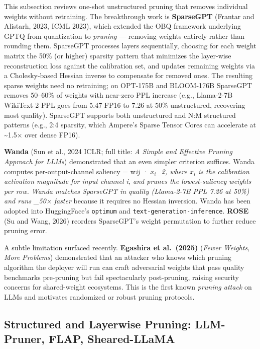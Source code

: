This subsection reviews one-shot unstructured pruning that removes individual weights without retraining. The breakthrough work is \textbf{SparseGPT} (Frantar and Alistarh, 2023, ICML 2023), which extended the OBQ framework underlying GPTQ from quantization to \emph{pruning} --- removing weights entirely rather than rounding them. SparseGPT processes layers sequentially, choosing for each weight matrix the 50\% (or higher) sparsity pattern that minimizes the layer-wise reconstruction loss against the calibration set, and updates remaining weights via a Cholesky-based Hessian inverse to compensate for removed ones. The resulting sparse weights need no retraining; on OPT-175B and BLOOM-176B SparseGPT removes 50--60\% of weights with near-zero PPL increase (e.g., Llama-2-7B WikiText-2 PPL goes from 5.47 FP16 to 7.26 at 50\% unstructured, recovering most quality). SparseGPT supports both unstructured and N:M structured patterns (e.g., 2:4 sparsity, which Ampere's Sparse Tensor Cores can accelerate at \textasciitilde1.5× over dense FP16).

\textbf{Wanda} (Sun et al., 2024 ICLR; full title: \emph{A Simple and Effective Pruning Approach for LLMs}) demonstrated that an even simpler criterion suffices. Wanda computes per-output-channel saliency = \textbar w\emph{ij\textbar{} · \textbar\textbar{}\(x_i\)\textbar\textbar\_2, where \(x_i\) is the calibration activation magnitude for input channel i, and prunes the lowest-saliency weights per row. Wanda matches SparseGPT in quality (Llama-2-7B PPL 7.26 at 50\%) and runs \_50× faster} because it requires no Hessian inversion. Wanda has been adopted into HuggingFace's \texttt{optimum} and \texttt{text-generation-inference}. \textbf{ROSE} (Su and Wang, 2026) reorders SparseGPT's weight permutation to further reduce pruning error.

A subtle limitation surfaced recently. \textbf{Egashira et al.~(2025)} (\emph{Fewer Weights, More Problems}) demonstrated that an attacker who knows which pruning algorithm the deployer will run can craft adversarial weights that pass quality benchmarks pre-pruning but fail spectacularly post-pruning, raising security concerns for shared-weight ecosystems. This is the first known \emph{pruning attack} on LLMs and motivates randomized or robust pruning protocols.

\subsection{Structured and Layerwise Pruning: LLM-Pruner, FLAP, Sheared-LLaMA}\label{structured-and-layerwise-pruning-llm-pruner-flap-sheared-llama}

